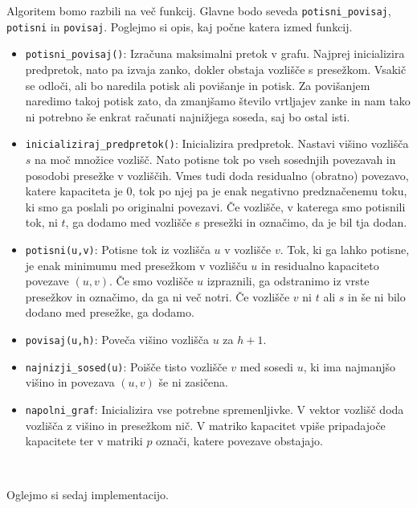 \documentclass[mat1]{fmfdelo}
\begin{document}
Algoritem bomo razbili na več funkcij. Glavne bodo seveda \texttt{potisni\_povisaj}, \texttt{potisni} in \texttt{povisaj}. Poglejmo si opis, kaj počne katera izmed funkcij.

\begin{itemize}
\item \texttt{potisni\_povisaj()}: Izračuna maksimalni pretok v grafu. Najprej inicializira predpretok, nato pa izvaja zanko, dokler obstaja vozlišče s presežkom. Vsakič se odloči, ali bo naredila potisk ali povišanje in potisk. Za povišanjem naredimo takoj potisk zato, da zmanjšamo število vrtljajev zanke in nam tako ni potrebno še enkrat računati najnižjega soseda, saj bo ostal isti.
\item \texttt{inicializiraj\_predpretok()}: Inicializira predpretok. Nastavi višino vozlišča $s$ na moč množice vozlišč. Nato potisne tok po vseh sosednjih povezavah in posodobi presežke v vozliščih. Vmes tudi doda residualno (obratno) povezavo, katere kapaciteta je $0$, tok po njej pa je enak negativno predznačenemu toku, ki smo ga poslali po originalni povezavi. Če vozlišče, v katerega smo potisnili tok, ni $t$, ga dodamo med vozlišče s presežki in označimo, da je bil tja dodan.
\item \texttt{potisni(u,v)}: Potisne tok iz vozlišča $u$ v vozlišče $v$. Tok, ki ga lahko potisne, je enak minimumu med presežkom v vozlišču $u$ in residualno kapaciteto povezave $(u,v)$. Če smo vozlišče $u$ izpraznili, ga odstranimo iz vrste presežkov in označimo, da ga ni več notri. Če vozlišče $v$ ni $t$ ali $s$ in še ni bilo dodano med presežke, ga dodamo.
\item \texttt{povisaj(u,h)}: Poveča višino vozlišča $u$ za $h+1$.
\item \texttt{najnizji\_sosed(u)}: Poišče tisto vozlišče $v$ med sosedi $u$, ki ima najmanjšo višino in povezava $(u,v)$ še ni zasičena.
\item \texttt{napolni\_graf}: Inicializira vse potrebne spremenljivke. V vektor vozlišč doda vozlišča z višino in presežkom nič. V matriko kapacitet vpiše pripadajoče kapacitete ter v matriki $p$ označi, katere povezave obstajajo.
\end{itemize}~

Oglejmo si sedaj implementacijo.
\end{document}
